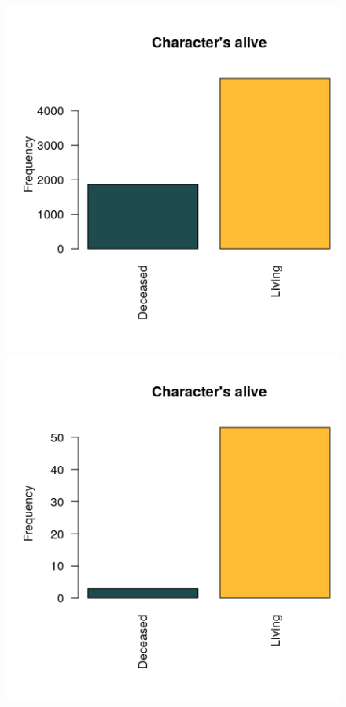 \begin{figure}[!htb]
    \centering
    \begin{minipage}{.47\textwidth}
        \centering
        \includegraphics[width=\linewidth]{img/aliveratio.png}
    \end{minipage}%
     \begin{minipage}{.06\textwidth}
      \hfill
    \end{minipage}%
    \begin{minipage}{0.47\textwidth}
       \centering
       \includegraphics[width=\linewidth]{img/popdeceasedalive.png}
    \end{minipage}
\end{figure}

